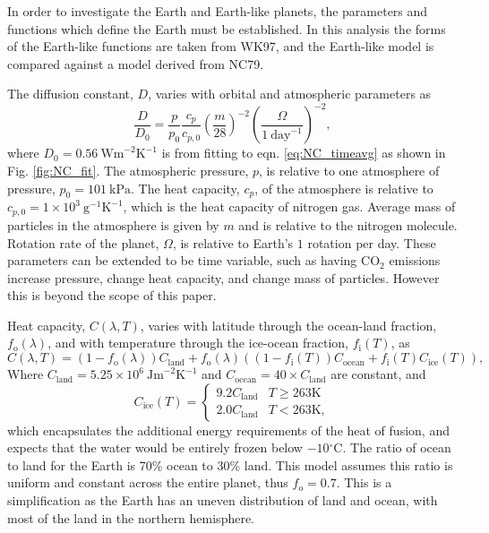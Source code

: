 \documentclass[12pt, onecolumn]{revtex4-2}    %
\newcommand{\heatcap}{\ensuremath{\ \text{Jm}^{-2} \text{K}^{-1}}}
\newcommand{\diffusion}{\ensuremath{\ \text{Wm}^{-2} \text{K}^{-1}}}
\newcommand{\degrees}{\ensuremath{^{\circ}}}
\begin{document}
In order to investigate the Earth and Earth-like planets, the parameters and functions which define the Earth must be established.
In this analysis the forms of the Earth-like functions are taken from WK97, and the Earth-like model is compared against a model derived from NC79.


The diffusion constant, $D$, varies with orbital and atmospheric parameters as
\begin{equation}
  \frac{D}{D_0} = \frac{p}{p_0} \frac{c_p}{c_{p,0}} \left(\frac{m}{28}\right)^{-2} \left(\frac{\Omega}{1\ \text{day}^{-1}}\right)^{-2},
  \label{eq:diffusion_eqn}
\end{equation}
where $D_0 = 0.56 \diffusion$ is from fitting to eqn. \eqref{eq:NC_timeavg} as shown in Fig. \ref{fig:NC_fit}.
The atmospheric pressure, $p$, is relative to one atmosphere of pressure, $p_0 = 101 \ \text{kPa}$.
The heat capacity, $c_p$, of the atmosphere is relative to $c_{p,0} = 1\times10^3 \ \text{g}^{-1} \text{K}^{-1}$, which is the heat capacity of nitrogen gas.
Average mass of particles in the atmosphere is given by $m$ and is relative to the nitrogen molecule.
Rotation rate of the planet, $\Omega$, is relative to Earth's $1$ rotation per day.
These parameters can be extended to be time variable, such as having CO$_2$ emissions increase pressure, change heat capacity, and change mass of particles.
However this is beyond the scope of this paper.

Heat capacity, $C(\lambda, T)$, varies with latitude through the ocean-land fraction, $f_\text{o}(\lambda)$, and with temperature through the ice-ocean fraction, $f_\text{i}(T)$, as
\begin{equation}
  C(\lambda, T) = (1 - f_\text{o}(\lambda)) C_\text{land} + f_\text{o}(\lambda) ((1-f_\text{i}(T)) C_\text{ocean} + f_\text{i}(T) C_\text{ice}(T)),
  \label{eq:heat_capacity}
\end{equation}
Where $C_{\text{land}} = 5.25\times10^6 \heatcap$ and $C_{\text{ocean}} = 40 \times C_{\text{land}}$ are constant, and
\begin{equation}
  C_{\text{ice}}(T) =
  \begin{cases}
    9.2 C_\text{land} & T \ge 263\text{K} \\
    2.0 C_\text{land} & T < 263\text{K},
  \end{cases}
  \label{eq:heat_capacity_ice}
\end{equation}
which encapsulates the additional energy requirements of the heat of fusion, and expects that the water would be entirely frozen below $-10\degrees$C.
The ratio of ocean to land for the Earth is 70\% ocean to 30\% land.
This model assumes this ratio is uniform and constant across the entire planet, thus $f_\text{o} = 0.7$.
This is a simplification as the Earth has an uneven distribution of land and ocean, with most of the land in the northern hemisphere.
\end{document}
